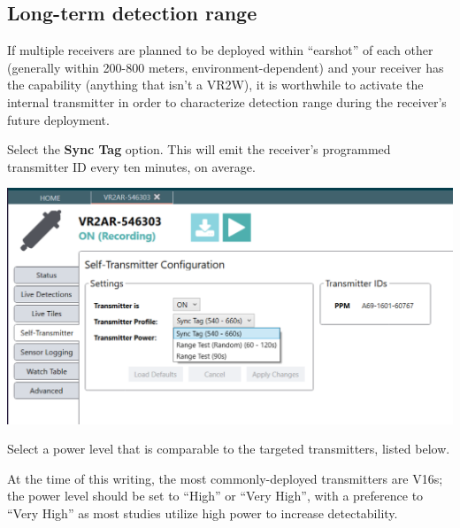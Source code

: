 \documentclass[
  letterpaper,
  DIV=11,
  numbers=noendperiod]{scrreprt}
\begin{document}
\subsection{Long-term detection range}\label{long-term-detection-range}

If multiple receivers are planned to be deployed within ``earshot'' of
each other (generally within 200-800 meters, environment-dependent) and
your receiver has the capability (anything that isn't a VR2W), it is
worthwhile to activate the internal transmitter in order to characterize
detection range during the receiver's future deployment.

Select the \textbf{Sync Tag} option. This will emit the receiver's
programmed transmitter ID every ten minutes, on average.

\includegraphics{images/fathom/self_transmitter_profile.png}

Select a power level that is comparable to the targeted transmitters,
listed below.

\begin{tcolorbox}[enhanced jigsaw, title=\textcolor{quarto-callout-note-color}{\faInfo}\hspace{0.5em}{Note}, leftrule=.75mm, colback=white, colframe=quarto-callout-note-color-frame, opacityback=0, toptitle=1mm, titlerule=0mm, colbacktitle=quarto-callout-note-color!10!white, toprule=.15mm, left=2mm, bottomtitle=1mm, arc=.35mm, breakable, coltitle=black, rightrule=.15mm, bottomrule=.15mm, opacitybacktitle=0.6]

At the time of this writing, the most commonly-deployed transmitters are
V16s; the power level should be set to ``High'' or ``Very High'', with a
preference to ``Very High'' as most studies utilize high power to
increase detectability.

\end{tcolorbox}
\end{document}
